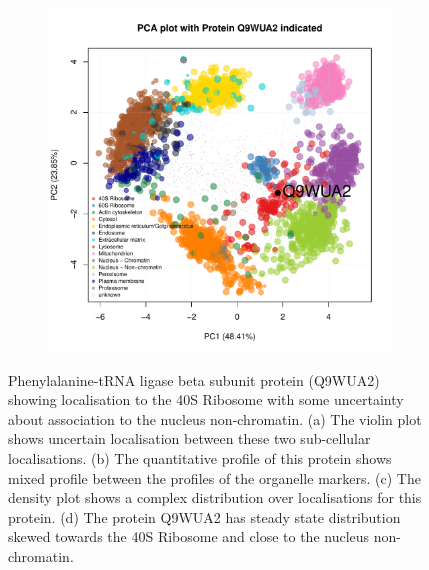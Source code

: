 \documentclass[12pt,english]{article}\usepackage[]{graphicx}\usepackage[]{color}
\makeatletter
\def\maxwidth{ %
  \ifdim\Gin@nat@width>\linewidth
    \linewidth
  \else
    \Gin@nat@width
  \fi
}
\newenvironment{knitrout}{}{} %
\makeatother
\begin{document}
\begin{figure}[h]
\begin{subfigure}[t]{0.5\textwidth}
\begin{knitrout}
{}



\end{knitrout}
    \caption{}
  \end{subfigure}%
  \begin{subfigure}[t]{0.5\textwidth}
    \centering
\begin{knitrout}
\color{fgcolor}

{\centering \includegraphics[width=\maxwidth]{figure/unnamed-chunk-19-1} 

}



\end{knitrout}
    \caption{}
  \end{subfigure}

  \caption{Phenylalanine-tRNA ligase beta subunit protein (Q9WUA2)
    showing localisation to the 40S Ribosome with some uncertainty
    about association to the nucleus non-chromatin.  (a) The violin
    plot shows uncertain localisation between these two sub-cellular
    localisations. (b) The quantitative profile of this protein shows
    mixed profile between the profiles of the organelle markers. (c)
    The density plot shows a complex distribution over localisations
    for this protein. (d) The protein Q9WUA2 has steady state
    distribution skewed towards the 40S Ribosome and close to the
    nucleus non-chromatin.}
  \label{fig:Q9WUA2}
\end{figure}
\end{document}
